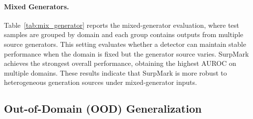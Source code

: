 \documentclass{article}
\theoremstyle{plain}
\theoremstyle{definition}
\theoremstyle{remark}
\begin{document}
\paragraph{Mixed Generators.}
Table~\ref{tab:mix_generator} reports the mixed-generator evaluation, where test samples are grouped by domain and each group contains outputs from multiple source generators. 
This setting evaluates whether a detector can maintain stable performance when the domain is fixed but the generator source varies. 
SurpMark achieves the strongest overall performance, obtaining the highest AUROC on multiple domains. 
These results indicate that SurpMark is more robust to heterogeneous generation sources under mixed-generator inputs.






\vspace{-2mm}
\subsection{Out-of-Domain (OOD) Generalization}
\vspace{-2mm}
\end{document}
